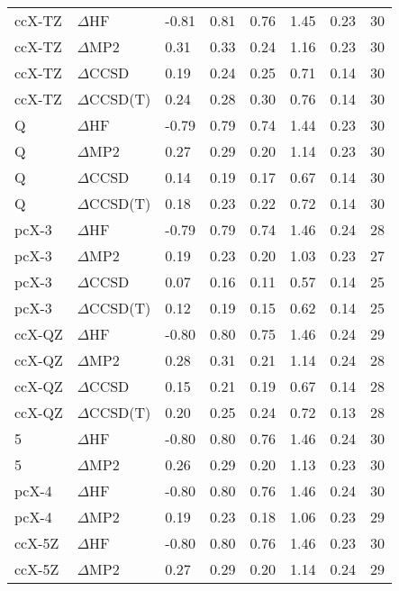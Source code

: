 \begin{table}
\begin{tabular}{l l l l l l l l }
    ccX-TZ & $\Delta$HF & -0.81 & 0.81 & 0.76 & 1.45 & 0.23 & 30 \\ 
    ccX-TZ & $\Delta$MP2 & 0.31 & 0.33 & 0.24 & 1.16 & 0.23 & 30 \\ 
    ccX-TZ & $\Delta$CCSD & 0.19 & 0.24 & 0.25 & 0.71 & 0.14 & 30 \\ 
    ccX-TZ & $\Delta$CCSD(T) & 0.24 & 0.28 & 0.30 & 0.76 & 0.14 & 30 \\ 
    Q & $\Delta$HF & -0.79 & 0.79 & 0.74 & 1.44 & 0.23 & 30 \\ 
    Q & $\Delta$MP2 & 0.27 & 0.29 & 0.20 & 1.14 & 0.23 & 30 \\ 
    Q & $\Delta$CCSD & 0.14 & 0.19 & 0.17 & 0.67 & 0.14 & 30 \\ 
    Q & $\Delta$CCSD(T) & 0.18 & 0.23 & 0.22 & 0.72 & 0.14 & 30 \\ 
    pcX-3 & $\Delta$HF & -0.79 & 0.79 & 0.74 & 1.46 & 0.24 & 28 \\ 
    pcX-3 & $\Delta$MP2 & 0.19 & 0.23 & 0.20 & 1.03 & 0.23 & 27 \\ 
    pcX-3 & $\Delta$CCSD & 0.07 & 0.16 & 0.11 & 0.57 & 0.14 & 25 \\ 
    pcX-3 & $\Delta$CCSD(T) & 0.12 & 0.19 & 0.15 & 0.62 & 0.14 & 25 \\ 
    ccX-QZ & $\Delta$HF & -0.80 & 0.80 & 0.75 & 1.46 & 0.24 & 29 \\ 
    ccX-QZ & $\Delta$MP2 & 0.28 & 0.31 & 0.21 & 1.14 & 0.24 & 28 \\ 
    ccX-QZ & $\Delta$CCSD & 0.15 & 0.21 & 0.19 & 0.67 & 0.14 & 28 \\ 
    ccX-QZ & $\Delta$CCSD(T) & 0.20 & 0.25 & 0.24 & 0.72 & 0.13 & 28 \\ 
    5 & $\Delta$HF & -0.80 & 0.80 & 0.76 & 1.46 & 0.24 & 30 \\ 
    5 & $\Delta$MP2 & 0.26 & 0.29 & 0.20 & 1.13 & 0.23 & 30 \\ 
    pcX-4 & $\Delta$HF & -0.80 & 0.80 & 0.76 & 1.46 & 0.24 & 30 \\ 
    pcX-4 & $\Delta$MP2 & 0.19 & 0.23 & 0.18 & 1.06 & 0.23 & 29 \\ 
    ccX-5Z & $\Delta$HF & -0.80 & 0.80 & 0.76 & 1.46 & 0.23 & 30 \\ 
    ccX-5Z & $\Delta$MP2 & 0.27 & 0.29 & 0.20 & 1.14 & 0.24 & 29 \\ 
    \bottomrule
  \end{tabular}
\end{table}
